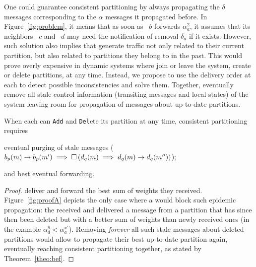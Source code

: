 One could guarantee consistent partitioning by always propagating the
$\delta$ messages corresponding to the $\alpha$ messages it propagated
before. In Figure~\ref{fig:problem}, it means that as soon as
\Process~$b$ forwards $\alpha_a^2$, it assumes that its neighbors
\Process~$c$ and \Process~$d$ may need the notification of removal
$\delta_a$ if it exists. However, such solution also implies that
\processes generate traffic not only related to their current
partition, but also related to partitions they belong to in the
past. This would prove overly expensive in dynamic systems where
\processes join or leave the system, create or delete partitions, at
any time.  Instead, we propose to use the delivery order at each
\process to detect possible inconsistencies and solve them. Together,
\processes eventually remove all stale control information (transiting
messages and local states) of the system leaving room for propagation
of messages about up-to-date partitions.

\begin{corollary}
%
When each \process can \texttt{Add} and \texttt{Del}ete its partition
at any time, consistent partitioning requires
\begin{inparaenum}[(i)]
\item eventual purging of stale messages ($b_p(m) \rightarrow b_p(m')
  \implies \square\, (d_q(m) \implies d_q(m) \rightarrow
  d_q(m''))$);
\item and best eventual forwarding.
\end{inparaenum}
\end{corollary}

\begin{proof}
  \Processes deliver and forward the best sum of weights they
  received. Figure~\ref{fig:proofA} depicts the only case where a
  \process would block such epidemic propagation: the \process
  received and delivered a message from a partition that has since
  then been deleted but with a better sum of weights than newly
  received ones (in the example $\alpha_d^y <
  \alpha_a^{x'}$). Removing \emph{forever} all such stale messages
  about deleted partitions would allow \processes to propagate their
  best up-to-date partition again, eventually reaching consistent
  partitioning together, as stated by Theorem~\ref{theo:bef}.
\end{proof}



